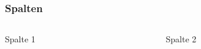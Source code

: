 \begin{frame}
\frametitle{Spalten}

\begin{columns}
\begin{column}{0.6\textwidth}
Spalte 1
\end{column}
\begin{column}{0.3\textwidth}
Spalte 2
\end{column}
\end{columns}
\end{frame}
